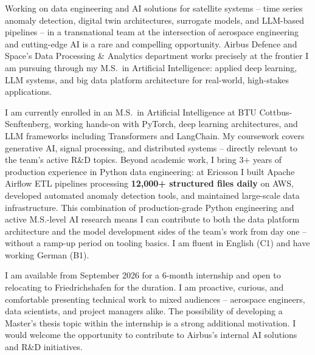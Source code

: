 \documentclass[11pt, a4paper]{awesome-cv}
\begin{document}
\makecvheader[R]
\makelettertitle

\begin{cvletter}

Working on data engineering and AI solutions for satellite systems -- time series anomaly detection, digital twin architectures, surrogate models, and LLM-based pipelines -- in a transnational team at the intersection of aerospace engineering and cutting-edge AI is a rare and compelling opportunity. Airbus Defence and Space's Data Processing \& Analytics department works precisely at the frontier I am pursuing through my M.S.\ in Artificial Intelligence: applied deep learning, LLM systems, and big data platform architecture for real-world, high-stakes applications.

I am currently enrolled in an M.S.\ in Artificial Intelligence at BTU Cottbus-Senftenberg, working hands-on with PyTorch, deep learning architectures, and LLM frameworks including Transformers and LangChain. My coursework covers generative AI, signal processing, and distributed systems -- directly relevant to the team's active R\&D topics. Beyond academic work, I bring 3+ years of production experience in Python data engineering: at Ericsson I built Apache Airflow ETL pipelines processing \textbf{12,000+ structured files daily} on AWS, developed automated anomaly detection tools, and maintained large-scale data infrastructure. This combination of production-grade Python engineering and active M.S.-level AI research means I can contribute to both the data platform architecture and the model development sides of the team's work from day one -- without a ramp-up period on tooling basics. I am fluent in English (C1) and have working German (B1).

I am available from September 2026 for a 6-month internship and open to relocating to Friedrichshafen for the duration. I am proactive, curious, and comfortable presenting technical work to mixed audiences -- aerospace engineers, data scientists, and project managers alike. The possibility of developing a Master's thesis topic within the internship is a strong additional motivation. I would welcome the opportunity to contribute to Airbus's internal AI solutions and R\&D initiatives.

\end{cvletter}

\makeletterclosing
\end{document}
